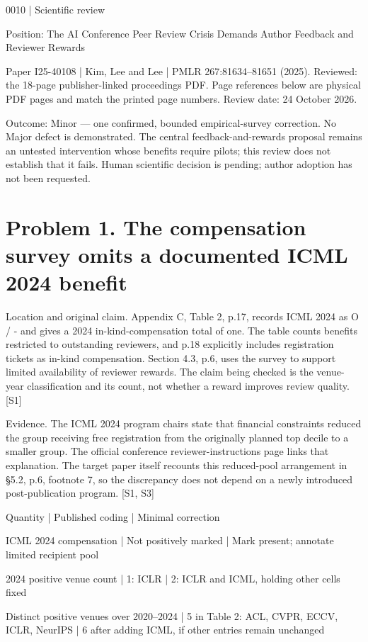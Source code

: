 \documentclass[10pt]{article}
\begin{document}
0010 | Scientific review\par
Position: The AI Conference Peer Review Crisis Demands Author Feedback and Reviewer Rewards\par
Paper I25-40108 | Kim, Lee and Lee | PMLR 267:81634–81651 (2025). Reviewed: the 18-page publisher-linked proceedings PDF. Page references below are physical PDF pages and match the printed page numbers. Review date: 24 October 2026.\par
Outcome: Minor — one confirmed, bounded empirical-survey correction. No Major defect is demonstrated. The central feedback-and-rewards proposal remains an untested intervention whose benefits require pilots; this review does not establish that it fails. Human scientific decision is pending; author adoption has not been requested.\par
\section*{Problem 1. The compensation survey omits a documented ICML 2024 benefit}
Location and original claim. Appendix C, Table 2, p.17, records ICML 2024 as O / - and gives a 2024 in-kind-compensation total of one. The table counts benefits restricted to outstanding reviewers, and p.18 explicitly includes registration tickets as in-kind compensation. Section 4.3, p.6, uses the survey to support limited availability of reviewer rewards. The claim being checked is the venue-year classification and its count, not whether a reward improves review quality. [S1]\par
Evidence. The ICML 2024 program chairs state that financial constraints reduced the group receiving free registration from the originally planned top decile to a smaller group. The official conference reviewer-instructions page links that explanation. The target paper itself recounts this reduced-pool arrangement in §5.2, p.6, footnote 7, so the discrepancy does not depend on a newly introduced post-publication program. [S1, S3]\par
Quantity | Published coding | Minimal correction\par
ICML 2024 compensation | Not positively marked | Mark present; annotate limited recipient pool\par
2024 positive venue count | 1: ICLR | 2: ICLR and ICML, holding other cells fixed\par
Distinct positive venues over 2020–2024 | 5 in Table 2: ACL, CVPR, ECCV, ICLR, NeurIPS | 6 after adding ICML, if other entries remain unchanged\par
\end{document}
